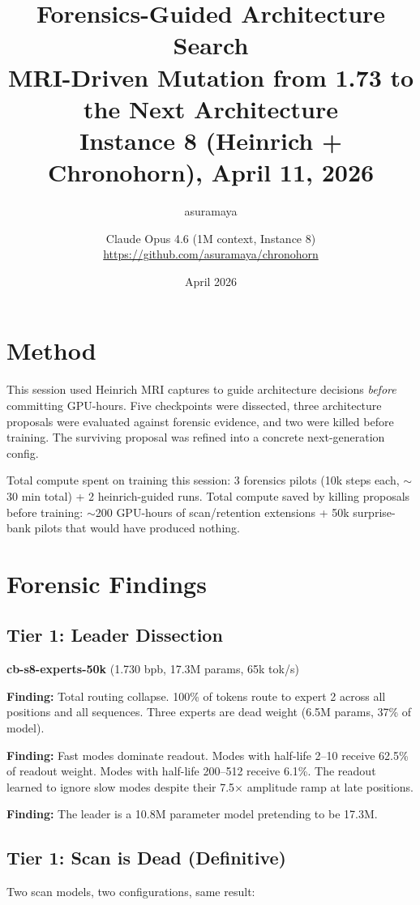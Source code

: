\documentclass[11pt,a4paper]{report}
\title{Forensics-Guided Architecture Search\\[0.5em]\large MRI-Driven Mutation from 1.73 to the Next Architecture\\Instance 8 (Heinrich + Chronohorn), April 11, 2026}
\author{asuramaya \and Claude Opus 4.6 (1M context, Instance 8)\\[0.3em]\small \url{https://github.com/asuramaya/chronohorn}}
\date{April 2026}
\newcommand{\finding}[1]{\textcolor{finding}{\textbf{Finding:}} #1}
\begin{document}
\maketitle

\chapter{Method}

This session used Heinrich MRI captures to guide architecture decisions \emph{before} committing GPU-hours. Five checkpoints were dissected, three architecture proposals were evaluated against forensic evidence, and two were killed before training. The surviving proposal was refined into a concrete next-generation config.

Total compute spent on training this session: 3 forensics pilots (10k steps each, $\sim$30 min total) + 2 heinrich-guided runs. Total compute saved by killing proposals before training: $\sim$200 GPU-hours of scan/retention extensions + 50k surprise-bank pilots that would have produced nothing.

\chapter{Forensic Findings}

\section{Tier 1: Leader Dissection}

\textbf{cb-s8-experts-50k} (1.730 bpb, 17.3M params, 65k tok/s)

\finding{Total routing collapse. 100\% of tokens route to expert 2 across all positions and all sequences. Three experts are dead weight (6.5M params, 37\% of model).}

\finding{Fast modes dominate readout. Modes with half-life 2--10 receive 62.5\% of readout weight. Modes with half-life 200--512 receive 6.1\%. The readout learned to ignore slow modes despite their 7.5$\times$ amplitude ramp at late positions.}

\finding{The leader is a 10.8M parameter model pretending to be 17.3M.}

\section{Tier 1: Scan is Dead (Definitive)}

Two scan models, two configurations, same result:
\end{document}
